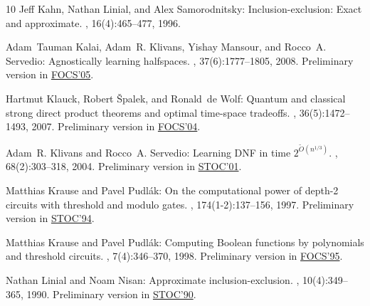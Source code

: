 \begin{thebibliography}{10}
{\sc Jeff Kahn, Nathan Linial, and Alex Samorodnitsky}: Inclusion-exclusion:
  Exact and approximate.
, 16(4):465--477, 1996.
\newblock [\epfmtdoi{10.1007/BF01271266}]

{\sc Adam~Tauman Kalai, Adam~R. Klivans, Yishay Mansour, and Rocco~A.
  Servedio}: Agnostically learning halfspaces.
, 37(6):1777--1805, 2008.
\newblock Preliminary version in
  \href{http://dx.doi.org/10.1109/SFCS.2005.13}{FOCS'05}.
\newblock [\epfmtdoi{10.1137/060649057}]

{\sc Hartmut Klauck, Robert {\v S}palek, and Ronald~de Wolf}: Quantum and
  classical strong direct product theorems and optimal time-space tradeoffs.
, 36(5):1472--1493, 2007.
\newblock Preliminary version in
  \href{http://dx.doi.org/10.1109/FOCS.2004.52}{FOCS'04}.
\newblock [\epfmtdoi{10.1137/05063235X}]

{\sc Adam~R. Klivans and Rocco~A. Servedio}: Learning {DNF} in time {$2^{\tilde
  O(n^{1/3})}$}.
, 68(2):303--318, 2004.
\newblock Preliminary version in
  \href{http://dx.doi.org/10.1145/380752.380809}{STOC'01}.

{\sc Matthias Krause and Pavel Pudl{\'a}k}: On the computational power of
  depth-2 circuits with threshold and modulo gates.
, 174(1-2):137--156, 1997.
\newblock Preliminary version in
  \href{http://dx.doi.org/10.1145/195058.195103}{STOC'94}.
\newblock [\epfmtdoi{10.1016/S0304-3975(96)00019-9}]

{\sc Matthias Krause and Pavel Pudl{\'a}k}: Computing {B}oolean functions by
  polynomials and threshold circuits.
, 7(4):346--370, 1998.
\newblock Preliminary version in
  \href{http://dx.doi.org/10.1109/SFCS.1995.492670}{FOCS'95}.
\newblock [\epfmtdoi{10.1007/s000370050015}]

{\sc Nathan Linial and Noam Nisan}: Approximate inclusion-exclusion.
, 10(4):349--365, 1990.
\newblock Preliminary version in
  \href{http://dx.doi.org/10.1145/100216.100250}{STOC'90}.
\newblock [\epfmtdoi{10.1007/BF02128670}]


\end{thebibliography}
